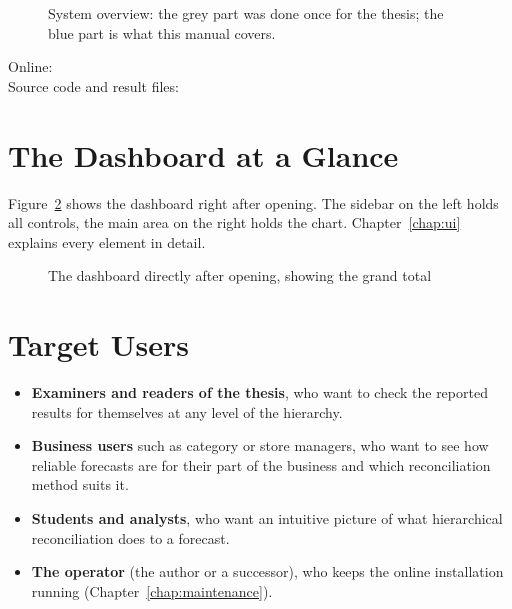 \begin{figure}[H]
  \centering
  \resizebox{\linewidth}{!}{}
  \caption{System overview: the grey part was done once for the thesis; the blue part is what this manual covers.}
  \label{fig:systemOverview}
\end{figure}

\begin{NoteBox}
Online: \AppLink\\
Source code and result files: \RepoLink
\end{NoteBox}

\section{The Dashboard at a Glance}
\label{sec:atAGlance}

Figure~\ref{fig:dashboardOverview} shows the dashboard right after opening. The sidebar on the left holds all controls, the main area on the right holds the chart. Chapter~\ref{chap:ui} explains every element in detail.

\begin{figure}[H]
  \centering
  \caption{The dashboard directly after opening, showing the grand total}
  \label{fig:dashboardOverview}
\end{figure}

\section{Target Users}
\label{sec:targetUsers}

\begin{itemize}
  \item \textbf{Examiners and readers of the thesis}, who want to check the reported results for themselves at any level of the hierarchy.
  \item \textbf{Business users} such as category or store managers, who want to see how reliable forecasts are for their part of the business and which reconciliation method suits it.
  \item \textbf{Students and analysts}, who want an intuitive picture of what hierarchical reconciliation does to a forecast.
  \item \textbf{The operator} (the author or a successor), who keeps the online installation running (Chapter~\ref{chap:maintenance}).
\end{itemize}

